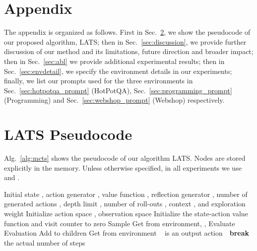 \documentclass{article} \usepackage{iclr2024_conference,times}
\begin{document}



\newpage

\section{Appendix}
\appendix

The appendix is organized as follows. First in Sec.~\ref{sec:pseudocode}, we show the pseudocode of our proposed algorithm, LATS; then in Sec.~\ref{sec:discussion}, we provide further discussion of our method and its limitations, future direction and broader impact; then in Sec.~\ref{sec:abl} we provide additional experimental results; then in Sec.~\ref{sec:envdetail}, we specify the environment details in our experiments; finally, we list our prompts used for the three environments in Sec.~\ref{sec:hotpotqa_prompt} (HotPotQA), Sec.~\ref{sec:programming_prompt} (Programming) and Sec.~\ref{sec:webshop_prompt} (Webshop) respectively.

\section{LATS Pseudocode}
\label{sec:pseudocode}
Alg.~\ref{alg:mcts} shows the pseudocode of our algorithm LATS. Nodes are stored explicitly in the memory. Unless otherwise specified, in all experiments we use  and .
\begin{algorithm}[ht]
\centering
\caption{ \label{alg:mcts}}
\begin{minipage}{0.9\linewidth} 
\small
\begin{algorithmic}
    \Require Initial state , action generator , value function {}, reflection generator , number of generated actions , depth limit , number of roll-outs , context , and exploration weight 
    \State Initialize action space , observation space 
    \State Initialize the state-action value function  and visit counter  to zero
    \For {}
        \For {}
             
                \For {}
                \State Sample 
                \State Get  from environment, , 
                \State Evaluate 
                \Comment Evaluation
                \State 
                \State Add  to children
                \EndFor
            \EndIf
                \State Get  from environment
                    \State 
                    \State 
                \EndIf
            \EndIf
            \State  {}
            \State 
            \State \algorithmicif\ { is an output action}\ \algorithmicthen\ \textbf{break}
        \EndFor
        \State  the actual number of steps
        \For {} 
            \State {}
        \EndFor
    \EndFor
\end{algorithmic}
\end{minipage}
\end{algorithm}
\end{document}
